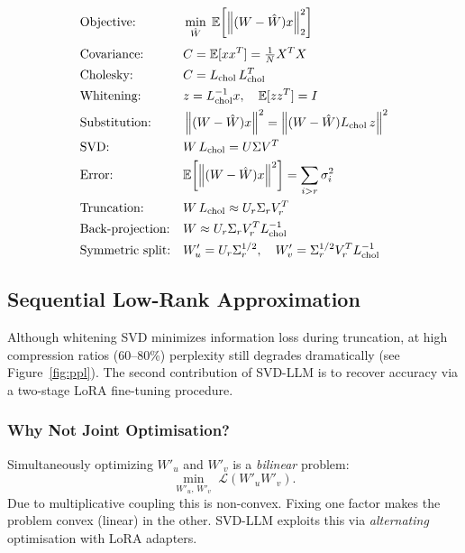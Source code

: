 \documentclass[11pt,a4paper]{article}
\newcommand{\Ebb}{\mathbb{E}}
\newcommand{\norm}[1]{\left\|#1\right\|}
\theoremstyle{remark}
\begin{document}
\begin{align}
  &\text{Objective:}
  && \min_{\hat{W}}\;\Ebb\!\left[\norm{(W-\hat{W})x}_2^2\right] \notag\\[3pt]
  &\text{Covariance:}
  && C = \Ebb[xx^T] = \tfrac{1}{N}X^TX \notag\\
  &\text{Cholesky:}
  && C = L_{\text{chol}}\,L_{\text{chol}}^T \notag\\
  &\text{Whitening:}
  && z = L_{\text{chol}}^{-1}x,\quad \Ebb[zz^T]=I \notag\\
  &\text{Substitution:}
  && \norm{(W-\hat{W})x}^2
     = \norm{(W-\hat{W})L_{\text{chol}}\,z}^2 \notag\\
  &\text{SVD:}
  && W\,L_{\text{chol}} = U\Sigma V^T \notag\\
  &\text{Error:}
  && \Ebb\!\left[\norm{(W-\hat{W})x}^2\right]
     = \sum_{i>r}\sigma_i^2 \notag\\
  &\text{Truncation:}
  && W\,L_{\text{chol}} \approx U_r\Sigma_r V_r^T \notag\\
  &\text{Back-projection:}
  && W \approx U_r\Sigma_r V_r^T L_{\text{chol}}^{-1} \notag\\
  &\text{Symmetric split:}
  && W'_u = U_r\Sigma_r^{1/2},\quad
     W'_v = \Sigma_r^{1/2}V_r^T L_{\text{chol}}^{-1} \notag
\end{align}

\subsection{Sequential Low-Rank Approximation}
\label{sec:lora}

Although whitening SVD minimizes information loss during truncation, at high
compression ratios (60--80\%) perplexity still degrades dramatically (see
Figure~\ref{fig:ppl}).  The second contribution of SVD-LLM is to recover
accuracy via a two-stage LoRA fine-tuning procedure.

\subsubsection*{Why Not Joint Optimisation?}

Simultaneously optimizing $W'_u$ and $W'_v$ is a \emph{bilinear} problem:
\begin{equation}
  \min_{W'_u,\,W'_v}\; \mathcal{L}(W'_u W'_v).
\end{equation}
Due to multiplicative coupling this is non-convex.  Fixing one factor makes
the problem convex (linear) in the other.  SVD-LLM exploits this via
\emph{alternating} optimisation with LoRA adapters.
\end{document}
